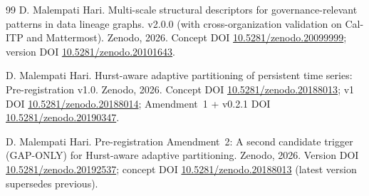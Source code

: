 \documentclass[11pt]{article}
\begin{document}
\begin{thebibliography}{99}
D. Malempati Hari.
Multi-scale structural descriptors for governance-relevant patterns in data lineage graphs.
v2.0.0 (with cross-organization validation on Cal-ITP and Mattermost).
Zenodo, 2026.
Concept DOI \href{https://doi.org/10.5281/zenodo.20099999}{10.5281/zenodo.20099999}; version DOI \href{https://doi.org/10.5281/zenodo.20101643}{10.5281/zenodo.20101643}.

D. Malempati Hari.
Hurst-aware adaptive partitioning of persistent time series: Pre-registration v1.0.
Zenodo, 2026.
Concept DOI \href{https://doi.org/10.5281/zenodo.20188013}{10.5281/zenodo.20188013}; v1 DOI \href{https://doi.org/10.5281/zenodo.20188014}{10.5281/zenodo.20188014}; Amendment~1 + v0.2.1 DOI \href{https://doi.org/10.5281/zenodo.20190347}{10.5281/zenodo.20190347}.

D. Malempati Hari.
Pre-registration Amendment~2: A second candidate trigger (GAP-ONLY) for Hurst-aware adaptive partitioning.
Zenodo, 2026.
Version DOI \href{https://doi.org/10.5281/zenodo.20192537}{10.5281/zenodo.20192537}; concept DOI \href{https://doi.org/10.5281/zenodo.20188013}{10.5281/zenodo.20188013} (latest version supersedes previous).

\end{thebibliography}
\end{document}
